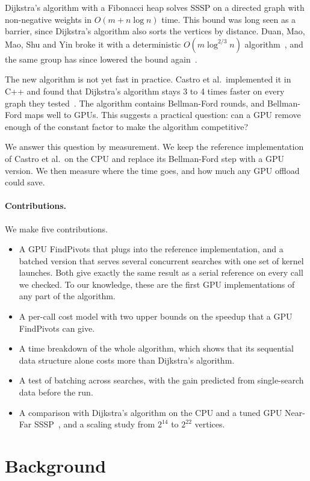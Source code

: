 \documentclass[conference]{IEEEtran}
\begin{document}
Dijkstra's algorithm with a Fibonacci heap solves SSSP on a directed graph with non-negative weights in
$O(m + n\log n)$ time. This bound was long seen as a barrier, since Dijkstra's algorithm also sorts the vertices by
distance. Duan, Mao, Mao, Shu and Yin broke it with a deterministic $O(m\log^{2/3} n)$ algorithm~\cite{duan2025}, and
the same group has since lowered the bound again~\cite{duan2026}.

The new algorithm is not yet fast in practice. Castro et al.\ implemented it in C++ and found that Dijkstra's algorithm
stays 3 to 4 times faster on every graph they tested~\cite{castro2025}. The algorithm contains Bellman-Ford rounds,
and Bellman-Ford maps well to GPUs. This suggests a practical question: can a GPU remove enough of the constant factor
to make the algorithm competitive?

We answer this question by measurement. We keep the reference implementation of Castro et al.\ on the CPU and replace
its Bellman-Ford step with a GPU version. We then measure where the time goes, and how much any GPU offload could save.

\paragraph{Contributions.} We make five contributions.
\begin{itemize}
\item A GPU FindPivots that plugs into the reference implementation, and a batched version that serves several
concurrent searches with one set of kernel launches. Both give exactly the same result as a serial reference on every
call we checked. To our knowledge, these are the first GPU implementations of any part of the algorithm.
\item A per-call cost model with two upper bounds on the speedup that a GPU FindPivots can give.
\item A time breakdown of the whole algorithm, which shows that its sequential data structure alone costs more than
Dijkstra's algorithm.
\item A test of batching across searches, with the gain predicted from single-search data before the run.
\item A comparison with Dijkstra's algorithm on the CPU and a tuned GPU Near-Far SSSP~\cite{davidson2014}, and a
scaling study from $2^{14}$ to $2^{22}$ vertices.
\end{itemize}

\section{Background}
\end{document}
